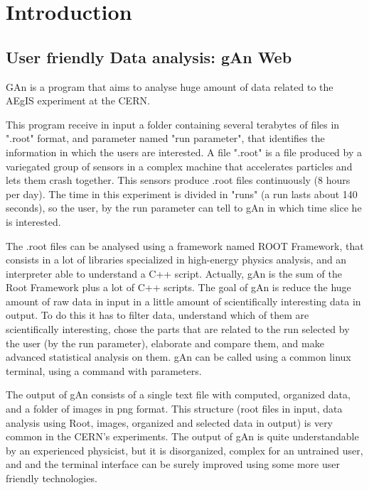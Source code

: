 
\chapter{Introduction} %

\label{Chapter1} %


\section{User friendly Data analysis: gAn Web}

GAn is a program that aims to analyse huge amount of data related to the AEgIS experiment at the CERN.
 
This program receive in input a folder containing several terabytes of files in ".root" format, and parameter named "run parameter", that identifies the information in which the users are interested. 
A file ".root" is a file produced by a variegated group of sensors in a complex machine that accelerates particles and lets them crash together. This sensors produce .root files continuously (8 hours per day). The time in this experiment is divided in "runs" (a run lasts about 140 seconds), so the user, by the run parameter can tell to gAn in which time slice he is interested.

The .root files can be analysed using a framework named ROOT Framework, that consists in a lot of libraries specialized in high-energy physics analysis, and an interpreter able to understand a C++ script.
Actually, gAn is the sum of the Root Framework plus a lot of C++ scripts.
The goal of gAn is reduce the huge amount of raw data in input in a little amount of scientifically interesting data in output. To do this it has to filter data, understand which of them are scientifically interesting, chose the parts that are related to the run selected by the user (by the run parameter), elaborate and compare them, and make advanced statistical analysis on them.  
gAn can be called using a common linux terminal, using a command with parameters. 

The output of gAn consists of a single text file with computed, organized data, and a folder of images in png format. 
This structure (root files in input, data analysis using Root, images, organized and selected data in output) is very common in the CERN's experiments. 
The output of gAn is quite understandable by an experienced physicist, but it is disorganized, complex for an untrained user, and and the terminal interface can be surely improved using some more user friendly technologies.


